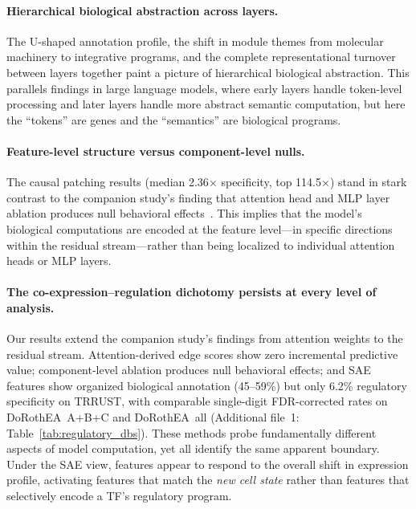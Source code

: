 \documentclass[onecolumn]{article}
\begin{document}
\paragraph{Hierarchical biological abstraction across layers.}
The U-shaped annotation profile, the shift in module themes from molecular machinery to integrative programs, and the complete representational turnover between layers together paint a picture of hierarchical biological abstraction. This parallels findings in large language models, where early layers handle token-level processing and later layers handle more abstract semantic computation, but here the ``tokens'' are genes and the ``semantics'' are biological programs.

\paragraph{Feature-level structure versus component-level nulls.}
The causal patching results (median 2.36$\times$ specificity, top 114.5$\times$) stand in stark contrast to the companion study's finding that attention head and MLP layer ablation produces null behavioral effects~\cite{kendiukhov2025systematic}. This implies that the model's biological computations are encoded at the feature level---in specific directions within the residual stream---rather than being localized to individual attention heads or MLP layers.

\paragraph{The co-expression--regulation dichotomy persists at every level of analysis.}
Our results extend the companion study's findings from attention weights to the residual stream. Attention-derived edge scores show zero incremental predictive value; component-level ablation produces null behavioral effects; and SAE features show organized biological annotation (45--59\%) but only 6.2\% regulatory specificity on TRRUST, with comparable single-digit FDR-corrected rates on DoRothEA~A+B+C and DoRothEA~all (Additional file~1: Table~\ref{tab:regulatory_dbs}). These methods probe fundamentally different aspects of model computation, yet all identify the same apparent boundary. Under the SAE view, features appear to respond to the overall shift in expression profile, activating features that match the \emph{new cell state} rather than features that selectively encode a TF's regulatory program.
\end{document}
